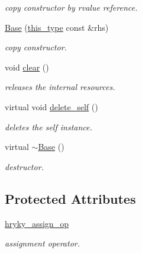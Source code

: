 \begin{DoxyCompactItemize}
\begin{DoxyCompactList}\small\item\em copy constructor by rvalue reference. \end{DoxyCompactList}\item 
\hypertarget{classhryky_1_1reduction_1_1_base_a13692fa5c57cab0f2b7fc1505c953074}{\hyperlink{classhryky_1_1reduction_1_1_base_a13692fa5c57cab0f2b7fc1505c953074}{Base} (\hyperlink{classhryky_1_1reduction_1_1_base_af02a7dee6042080b7380afd2f9500a42}{this\-\_\-type} const \&rhs)}\label{classhryky_1_1reduction_1_1_base_a13692fa5c57cab0f2b7fc1505c953074}

\begin{DoxyCompactList}\small\item\em copy constructor. \end{DoxyCompactList}\item 
\hypertarget{classhryky_1_1reduction_1_1_base_a135bce05655e290c78fa83196199a576}{void \hyperlink{classhryky_1_1reduction_1_1_base_a135bce05655e290c78fa83196199a576}{clear} ()}\label{classhryky_1_1reduction_1_1_base_a135bce05655e290c78fa83196199a576}

\begin{DoxyCompactList}\small\item\em releases the internal resources. \end{DoxyCompactList}\item 
virtual void \hyperlink{classhryky_1_1reduction_1_1_base_a100265b04179500cd7901c8afea64eb0}{delete\-\_\-self} ()
\begin{DoxyCompactList}\small\item\em deletes the self instance. \end{DoxyCompactList}\item 
\hypertarget{classhryky_1_1reduction_1_1_base_a722da881b6c70cfcbde9243abcfbf334}{virtual \hyperlink{classhryky_1_1reduction_1_1_base_a722da881b6c70cfcbde9243abcfbf334}{$\sim$\-Base} ()}\label{classhryky_1_1reduction_1_1_base_a722da881b6c70cfcbde9243abcfbf334}

\begin{DoxyCompactList}\small\item\em destructor. \end{DoxyCompactList}\end{DoxyCompactItemize}
\subsection*{Protected Attributes}
\begin{DoxyCompactItemize}
\item 
\hypertarget{classhryky_1_1reduction_1_1_base_a6f8f283a43f48c1599208b56f74d4403}{\hyperlink{classhryky_1_1reduction_1_1_base_a6f8f283a43f48c1599208b56f74d4403}{hryky\-\_\-assign\-\_\-op}}\label{classhryky_1_1reduction_1_1_base_a6f8f283a43f48c1599208b56f74d4403}

\begin{DoxyCompactList}\small\item\em assignment operator. \end{DoxyCompactList}\end{DoxyCompactItemize}
